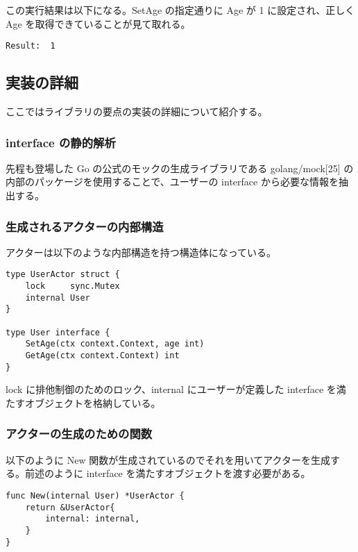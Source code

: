 この実行結果は以下になる。SetAge の指定通りに Age が 1
に設定され、正しく Age を取得できていることが見て取れる。

\begin{verbatim}
Result:  1
\end{verbatim}

\subsection{実装の詳細}

ここではライブラリの要点の実装の詳細について紹介する。

\subsubsection{interface の静的解析}

先程も登場した Go の公式のモックの生成ライブラリである
golang/mock{[}25{]} の内部のパッケージを使用することで、ユーザーの
interface から必要な情報を抽出する。

\subsubsection{生成されるアクターの内部構造}

アクターは以下のような内部構造を持つ構造体になっている。

\begin{verbatim}
type UserActor struct {
    lock     sync.Mutex
    internal User
}

type User interface {
    SetAge(ctx context.Context, age int)
    GetAge(ctx context.Context) int
}
\end{verbatim}

lock に排他制御のためのロック、internal にユーザーが定義した interface
を満たすオブジェクトを格納している。

\subsubsection{アクターの生成のための関数}

以下のように New
関数が生成されているのでそれを用いてアクターを生成する。前述のように
interface を満たすオブジェクトを渡す必要がある。

\begin{verbatim}
func New(internal User) *UserActor {
    return &UserActor{
        internal: internal,
    }
}
\end{verbatim}

